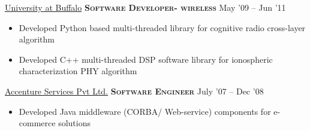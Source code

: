 \documentclass[10pt,a4paper]{article} %
\begin{document}

\headedsection %
{\href{http://www.ece.neu.edu/wineslab/}{University at Buffalo}}
{\textsc{\textbf{Software Developer- wireless}}} {May '09 -- Jun '11}
	\bodytext
	{
	  \begin{itemize}
		\item Developed Python based multi-threaded library for cognitive radio cross-layer algorithm
		\item Developed C++ multi-threaded DSP software library for ionospheric characterization PHY algorithm
	  \end{itemize}
	}


\headedsection %
{\href{http://www.accenture.com/}{Accenture Services Pvt Ltd.}}
{\textsc{\textbf{Software Engineer}}} {July '07 -- Dec '08}
	\bodytext
	{
	  \begin{itemize}
		\item Developed Java middleware (CORBA/ Web-service) components for e-commerce solutions
	  \end{itemize}
	}

\spacedhrule{0.5em}{-0.4em} %

\end{document}
